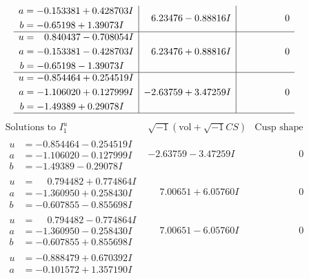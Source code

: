 \documentclass[1p]{elsarticle_modified}
\theoremstyle{definition}
\newcommand{\I}{\sqrt{-1}}
\begin{document}
$$\begin{array}{c|c|c}
\begin{aligned}
a &= -0.153381 + 0.428703 I \\
b &= -0.65198 + 1.39073 I\end{aligned}
 & \phantom{-}6.23476 - 0.88816 I & \phantom{-0.000000 } 0 \\ \hline\begin{aligned}
u &= \phantom{-}0.840437 - 0.708054 I \\
a &= -0.153381 - 0.428703 I \\
b &= -0.65198 - 1.39073 I\end{aligned}
 & \phantom{-}6.23476 + 0.88816 I & \phantom{-0.000000 } 0 \\ \hline\begin{aligned}
u &= -0.854464 + 0.254519 I \\
a &= -1.106020 + 0.127999 I \\
b &= -1.49389 + 0.29078 I\end{aligned}
 & -2.63759 + 3.47259 I & \phantom{-0.000000 } 0\\
 \hline 
 \end{array}$$\newpage$$\begin{array}{c|c|c}  
\text{Solutions to }I^u_{1}& \I (\text{vol} + \sqrt{-1}CS) & \text{Cusp shape}\\
 \hline 
\begin{aligned}
u &= -0.854464 - 0.254519 I \\
a &= -1.106020 - 0.127999 I \\
b &= -1.49389 - 0.29078 I\end{aligned}
 & -2.63759 - 3.47259 I & \phantom{-0.000000 } 0 \\ \hline\begin{aligned}
u &= \phantom{-}0.794482 + 0.774864 I \\
a &= -1.360950 + 0.258430 I \\
b &= -0.607855 - 0.855698 I\end{aligned}
 & \phantom{-}7.00651 + 6.05760 I & \phantom{-0.000000 } 0 \\ \hline\begin{aligned}
u &= \phantom{-}0.794482 - 0.774864 I \\
a &= -1.360950 - 0.258430 I \\
b &= -0.607855 + 0.855698 I\end{aligned}
 & \phantom{-}7.00651 - 6.05760 I & \phantom{-0.000000 } 0 \\ \hline\begin{aligned}
u &= -0.888479 + 0.670392 I \\
a &= -0.101572 + 1.357190 I \\

\end{aligned}
\end{array}$$
\end{document}
